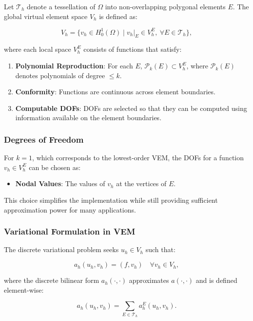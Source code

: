\documentclass[class=article, crop=false]{standalone}
\begin{document}
Let $\mathcal{T}_h$ denote a tessellation of $\Omega$ into non-overlapping polygonal elements $E$. The global virtual element space $V_h$ is defined as:

\[
V_h = \{ v_h \in H_0^1(\Omega) \mid v_h|_E \in V_h^E, \ \forall E \in \mathcal{T}_h \},
\]

where each local space $V_h^E$ consists of functions that satisfy:

\begin{enumerate}
    \item \textbf{Polynomial Reproduction}: For each $E$, $\mathcal{P}_k(E) \subset V_h^E$, where $\mathcal{P}_k(E)$ denotes polynomials of degree $\leq k$.
    \item \textbf{Conformity}: Functions are continuous across element boundaries.
    \item \textbf{Computable DOFs}: DOFs are selected so that they can be computed using information available on the element boundaries.
\end{enumerate}

\subsubsection{Degrees of Freedom}

For $k = 1$, which corresponds to the lowest-order VEM, the DOFs for a function $v_h \in V_h^E$ can be chosen as:

\begin{itemize}
    \item \textbf{Nodal Values}: The values of $v_h$ at the vertices of $E$.
\end{itemize}

This choice simplifies the implementation while still providing sufficient approximation power for many applications.

\subsubsection{Variational Formulation in VEM}

The discrete variational problem seeks $u_h \in V_h$ such that:

\[
a_h(u_h, v_h) = (f, v_h) \quad \forall v_h \in V_h,
\]

where the discrete bilinear form $a_h(\cdot, \cdot)$ approximates $a(\cdot, \cdot)$ and is defined element-wise:

\[
a_h(u_h, v_h) = \sum_{E \in \mathcal{T}_h} a_h^E(u_h, v_h).
\]
\end{document}
